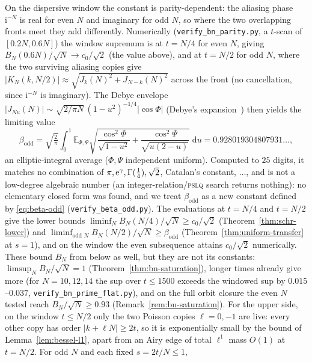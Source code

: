 \begin{remark}\label{rem:bn-parity}
On the dispersive window the constant is parity-dependent: the aliasing phase $\mathrm i^{-N}$ is real for
even $N$ and imaginary for odd $N$, so where the two overlapping fronts meet they add differently.
Numerically (\texttt{verify\_bn\_parity.py}, a $t$-scan of $[0.2N,0.6N]$) the window supremum is at $t=N/4$
for even $N$, giving $B_N(0.6N)/\sqrt N\to c_0/\sqrt2$ (the value above), and at $t=N/2$ for odd $N$, where
the two surviving aliasing copies give
$|K_N(k,N/2)|\approx\sqrt{J_k(N)^2+J_{N-k}(N)^2}$ across the front (no cancellation, since $\mathrm i^{-N}$
is imaginary). The Debye envelope $|J_{Nu}(N)|\sim\sqrt{2/\pi N}\,(1-u^2)^{-1/4}|\cos\Phi|$
(Debye's expansion~\cite[\S10.19(ii)]{DLMF}) then yields the
limiting value
\begin{equation}\label{eq:beta-odd}
  \beta_{\mathrm{odd}}=\sqrt{\tfrac2\pi}\int_0^1\mathbb E_{\Phi,\Psi}
     \sqrt{\frac{\cos^2\Phi}{\sqrt{1-u^2}}+\frac{\cos^2\Psi}{\sqrt{u(2-u)}}}\;\mathrm du=0.928019304807931\ldots,
\end{equation}
an elliptic-integral average ($\Phi,\Psi$ independent uniform). Computed to $25$ digits, it matches no
combination of $\pi,\mathrm{e}^\gamma,\Gamma(\tfrac14),\sqrt2$, Catalan's constant, $\ldots$, and is not a low-degree
algebraic number (an integer-relation/\textsc{pslq} search returns nothing): no elementary closed form was
found, and we treat $\beta_{\mathrm{odd}}$ as a new constant defined by \eqref{eq:beta-odd}
(\texttt{verify\_beta\_odd.py}). The evaluations at $t=N/4$ and $t=N/2$ give the lower bounds
$\liminf_NB_N(N/4)/\sqrt N\ge c_0/\sqrt2$ (Theorem~\ref{thm:schr-lower}) and
$\liminf_{\text{odd }N}B_N(N/2)/\sqrt N\ge\beta_{\mathrm{odd}}$ (Theorem~\ref{thm:uniform-transfer} at $s=1$), and on
the window the even subsequence attains $c_0/\sqrt2$ numerically. These bound $B_N$ from below as well, but they
are not its constants: $\limsup_NB_N/\sqrt N=1$ (Theorem~\ref{thm:bn-saturation}), longer times already give more
(for $N=10,12,14$ the sup over $t\le1500$ exceeds the windowed sup by $0.015$--$0.037$,
\texttt{verify\_bn\_prime\_flat.py}), and on the full orbit closure the even $N$ tested reach $B_N/\sqrt N\ge0.93$
(Remark~\ref{rem:bn-saturation}).
For the upper side, on the window $t\le N/2$ only the two Poisson copies $\ell=0,-1$ are live: every other copy
has order $|k+\ell N|\ge2t$, so it is exponentially small by the bound of Lemma~\ref{lem:bessel-l1}, apart from an
Airy edge of total $\ell^1$ mass $O(1)$ at $t=N/2$. For odd $N$ and each fixed $s=2t/N\le1$,

\end{remark}
